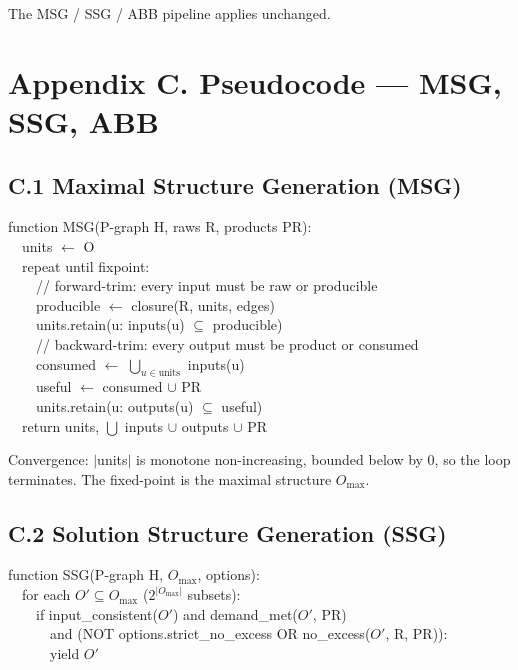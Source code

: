 \documentclass[11pt,a4paper]{article}
\begin{document}
The MSG / SSG / ABB pipeline applies unchanged.

\section*{Appendix C. Pseudocode --- MSG, SSG, ABB}

\subsection*{C.1 Maximal Structure Generation (MSG)}

\begin{tcolorbox}[colback=soft,colframe=deepblue!60,boxrule=0.2mm,fontupper=\ttfamily\small]
function MSG(P-graph H, raws R, products PR):\\
~~units $\leftarrow$ O\\
~~repeat until fixpoint:\\
~~~~// forward-trim: every input must be raw or producible\\
~~~~producible $\leftarrow$ closure(R, units, edges)\\
~~~~units.retain(u: inputs(u) $\subseteq$ producible)\\
~~~~// backward-trim: every output must be product or consumed\\
~~~~consumed $\leftarrow$ $\bigcup_{u\in\text{units}}$ inputs(u)\\
~~~~useful   $\leftarrow$ consumed $\cup$ PR\\
~~~~units.retain(u: outputs(u) $\subseteq$ useful)\\
~~return units, $\bigcup$ inputs $\cup$ outputs $\cup$ PR
\end{tcolorbox}

Convergence: $|$units$|$ is monotone non-increasing, bounded below by
$0$, so the loop terminates. The fixed-point is the maximal
structure $O_{\max}$.

\subsection*{C.2 Solution Structure Generation (SSG)}

\begin{tcolorbox}[colback=soft,colframe=deepblue!60,boxrule=0.2mm,fontupper=\ttfamily\small]
function SSG(P-graph H, $O_{\max}$, options):\\
~~for each $O' \subseteq O_{\max}$ ($2^{|O_{\max}|}$ subsets):\\
~~~~if input\_consistent($O'$) and demand\_met($O'$, PR)\\
~~~~~~and (NOT options.strict\_no\_excess OR no\_excess($O'$, R, PR)):\\
~~~~~~yield $O'$
\end{tcolorbox}
\end{document}
